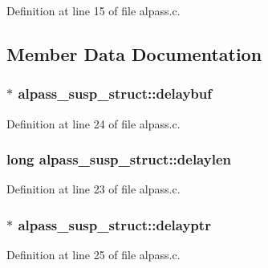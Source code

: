 Definition at line 15 of file alpass.\+c.



\subsection{Member Data Documentation}
\subsubsection[{\texorpdfstring{delaybuf}{delaybuf}}]{$\ast$ alpass\+\_\+susp\+\_\+struct\+::delaybuf}\hypertarget{structalpass__susp__struct_a062b32e9434c380c59c8390e490c990a}{}\label{structalpass__susp__struct_a062b32e9434c380c59c8390e490c990a}


Definition at line 24 of file alpass.\+c.

\subsubsection[{\texorpdfstring{delaylen}{delaylen}}]{\setlength{\rightskip}{0pt plus 5cm}long alpass\+\_\+susp\+\_\+struct\+::delaylen}\hypertarget{structalpass__susp__struct_ae822218ae7665a464671e161c64dfa44}{}\label{structalpass__susp__struct_ae822218ae7665a464671e161c64dfa44}


Definition at line 23 of file alpass.\+c.

\subsubsection[{\texorpdfstring{delayptr}{delayptr}}]{$\ast$ alpass\+\_\+susp\+\_\+struct\+::delayptr}\hypertarget{structalpass__susp__struct_a938e876b63e4eb5fe774500caac8e6b8}{}\label{structalpass__susp__struct_a938e876b63e4eb5fe774500caac8e6b8}


Definition at line 25 of file alpass.\+c.


